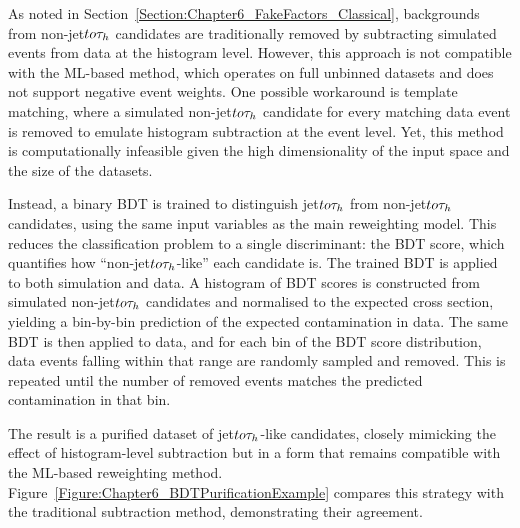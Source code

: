 As noted in Section~\ref{Section:Chapter6_FakeFactors_Classical}, backgrounds from non-jet$to\tau_h$ candidates are traditionally removed by subtracting simulated events from data at the histogram level. However, this approach is not compatible with the ML-based method, which operates on full unbinned datasets and does not support negative event weights. One possible workaround is template matching, where a simulated non-jet$to\tau_h$ candidate for every matching data event is removed to emulate histogram subtraction at the event level. Yet, this method is computationally infeasible given the high dimensionality of the input space and the size of the datasets.

Instead, a binary BDT is trained to distinguish jet$to\tau_h$ from non-jet$to\tau_h$ candidates, using the same input variables as the main reweighting model. This reduces the classification problem to a single discriminant: the BDT score, which quantifies how ``non-jet$to\tau_h$-like'' each candidate is. The trained BDT is applied to both simulation and data. A histogram of BDT scores is constructed from simulated non-jet$to\tau_h$ candidates and normalised to the expected cross section, yielding a bin-by-bin prediction of the expected contamination in data. The same BDT is then applied to data, and for each bin of the BDT score distribution, data events falling within that range are randomly sampled and removed. This is repeated until the number of removed events matches the predicted contamination in that bin.

The result is a purified dataset of jet$to\tau_h$-like candidates, closely mimicking the effect of histogram-level subtraction but in a form that remains compatible with the ML-based reweighting method. Figure~\ref{Figure:Chapter6_BDTPurificationExample} compares this strategy with the traditional subtraction method, demonstrating their agreement.

